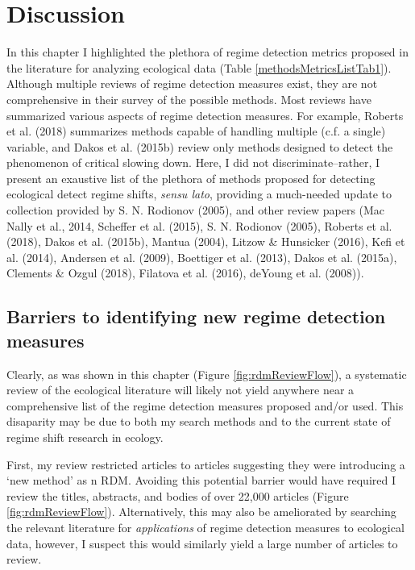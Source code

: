 \documentclass[12pt,twoside,openany]{reedthesis}
\begin{document}
\section{Discussion}\label{discussion}

In this chapter I highlighted the plethora of regime detection metrics
proposed in the literature for analyzing ecological data (Table
\ref{methodsMetricsListTab1}). Although multiple reviews of regime
detection measures exist, they are not comprehensive in their survey of
the possible methods. Most reviews have summarized various aspects of
regime detection measures. For example, Roberts et al. (2018) summarizes
methods capable of handling multiple (c.f. a single) variable, and Dakos
et al. (2015b) review only methods designed to detect the phenomenon of
critical slowing down. Here, I did not discriminate--rather, I present
an exaustive list of the plethora of methods proposed for detecting
ecological detect regime shifts, \emph{sensu lato}, providing a
much-needed update to collection provided by S. N. Rodionov (2005), and
other review papers (Mac Nally et al., 2014, Scheffer et al. (2015), S.
N. Rodionov (2005), Roberts et al. (2018), Dakos et al. (2015b), Mantua
(2004), Litzow \& Hunsicker (2016), Kefi et al. (2014), Andersen et al.
(2009), Boettiger et al. (2013), Dakos et al. (2015a), Clements \& Ozgul
(2018), Filatova et al. (2016), deYoung et al. (2008)).

\subsection{Barriers to identifying new regime detection
measures}\label{barriers-to-identifying-new-regime-detection-measures}

Clearly, as was shown in this chapter (Figure \ref{fig:rdmReviewFlow}),
a systematic review of the ecological literature will likely not yield
anywhere near a comprehensive list of the regime detection measures
proposed and/or used. This disaparity may be due to both my search
methods and to the current state of regime shift research in ecology.

First, my review restricted articles to articles suggesting they were
introducing a `new method' as n RDM. Avoiding this potential barrier
would have required I review the titles, abstracts, and bodies of over
22,000 articles (Figure \ref{fig:rdmReviewFlow}). Alternatively, this
may also be ameliorated by searching the relevant literature for
\emph{applications} of regime detection measures to ecological data,
however, I suspect this would similarly yield a large number of articles
to review.
\end{document}
